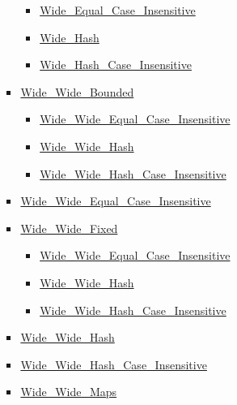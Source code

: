 \begin{scriptsize}
\begin{multicols*}{\columnnr}
\begin{itemize}[leftmargin=0mm]
\begin{itemize}[leftmargin=5mm]
\begin{itemize}[leftmargin=5mm]
	  \begin{itemize}[leftmargin=5mm]
	  \item[] \href{http://www.ada-auth.org/standards/22rm/html/RM-A-4-7.html}{Wide\_Equal\_Case\_Insensitive}
	  \item[] \href{http://www.ada-auth.org/standards/22rm/html/RM-A-4-7.html}{Wide\_Hash}
	  \item[] \href{http://www.ada-auth.org/standards/22rm/html/RM-A-4-7.html}{Wide\_Hash\_Case\_Insensitive}
	  \end{itemize}
	\item[] \href{http://www.ada-auth.org/standards/22rm/html/RM-A-4-8.html}{Wide\_Wide\_Bounded}
	  \begin{itemize}[leftmargin=5mm]
	  \item[] \href{http://www.ada-auth.org/standards/22rm/html/RM-A-4-8.html}{Wide\_Wide\_Equal\_Case\_Insensitive}
	  \item[] \href{http://www.ada-auth.org/standards/22rm/html/RM-A-4-8.html}{Wide\_Wide\_Hash}
	  \item[] \href{http://www.ada-auth.org/standards/22rm/html/RM-A-4-8.html}{Wide\_Wide\_Hash\_Case\_Insensitive}
	  \end{itemize}
	\item[] \href{http://www.ada-auth.org/standards/22rm/html/RM-A-4-8.html}{Wide\_Wide\_Equal\_Case\_Insensitive}
	\item[] \href{http://www.ada-auth.org/standards/22rm/html/RM-A-4-8.html}{Wide\_Wide\_Fixed}
	  \begin{itemize}[leftmargin=5mm]
	  \item[] \href{http://www.ada-auth.org/standards/22rm/html/RM-A-4-8.html}{Wide\_Wide\_Equal\_Case\_Insensitive}
	  \item[] \href{http://www.ada-auth.org/standards/22rm/html/RM-A-4-8.html}{Wide\_Wide\_Hash}
	  \item[] \href{http://www.ada-auth.org/standards/22rm/html/RM-A-4-8.html}{Wide\_Wide\_Hash\_Case\_Insensitive}
	  \end{itemize}
	\item[] \href{http://www.ada-auth.org/standards/22rm/html/RM-A-4-8.html}{Wide\_Wide\_Hash}
	\item[] \href{http://www.ada-auth.org/standards/22rm/html/RM-A-4-8.html}{Wide\_Wide\_Hash\_Case\_Insensitive}
	\item[] \href{http://www.ada-auth.org/standards/22rm/html/RM-A-4-8.html}{Wide\_Wide\_Maps}
	  \begin{itemize}[leftmargin=5mm]

\end{itemize}
\end{itemize}
\end{itemize}
\end{itemize}
\end{multicols*}
\end{scriptsize}
